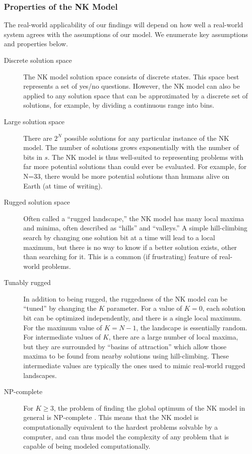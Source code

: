\documentclass[manuscript,screen,review,acmsmall]{acmart}
\begin{document}
\subsubsection{Properties of the NK Model}
The real-world applicability of our findings will depend on how well a real-world system agrees with the assumptions of our model.
We enumerate key assumptions and properties below.
\begin{description}
\item[Discrete solution space]
The NK model solution space consists of discrete states.
This space best represents a set of yes/no questions.
However, the NK model can also be applied to any solution space that can be approximated by a discrete set of solutions, for example, by dividing a continuous range into bins.
\item[Large solution space]
There are $2^N$ possible solutions for any particular instance of the NK model.
The number of solutions grows exponentially with the number of bits in $s$.
The NK model is thus well-suited to representing problems with far more potential solutions than could ever be evaluated.
For example, for N=33, there would be more potential solutions than humans alive on Earth (at time of writing).
\item[Rugged solution space]
Often called a ``rugged landscape,'' the NK model has many local maxima and minima,
often described as ``hills'' and ``valleys.''
A simple hill-climbing search by changing one solution bit at a time will lead to a local maximum,
but there is no way to know if a better solution exists, other than searching for it.
This is a common (if frustrating) feature of real-world problems.
\item[Tunably rugged]
In addition to being rugged, the ruggedness of the NK model can be ``tuned'' by changing the $K$ parameter.
For a value of $K=0$, each solution bit can be optimized independently, and there is a single local maximum.
For the maximum value of $K=N-1$,
the landscape is essentially random.
For intermediate values of $K$,
there are a large number of local maxima, but they are surrounded by ``basins of attraction'' which allow those maxima to be found from nearby solutions using hill-climbing.
These intermediate values are typically the ones used to mimic real-world rugged landscapes.
\item[NP-complete]
For $K \geq 3$, the problem of finding the global optimum of the NK model in general is NP-complete \cite{weinberger_np_1996}.
This means that the NK model is computationally equivalent to the hardest problems solvable by a computer,
and can thus model the complexity of any problem that is capable of being modeled computationally.
\end{description}
\end{document}

